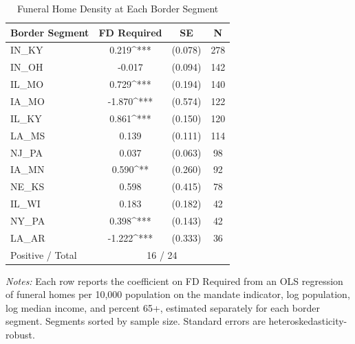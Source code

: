 \begin{table}[t]
\centering
\caption{Funeral Home Density at Each Border Segment}
\label{tab:segments}
\small
\begin{tabular}{lccc}
\hline\hline
 Border Segment & FD Required & SE & N \\
\hline
\addlinespace
  IN_KY & 0.219^{***} & (0.078) & 278 \\
  IN_OH & -0.017 & (0.094) & 142 \\
  IL_MO & 0.729^{***} & (0.194) & 140 \\
  IA_MO & -1.870^{***} & (0.574) & 122 \\
  IL_KY & 0.861^{***} & (0.150) & 120 \\
  LA_MS & 0.139 & (0.111) & 114 \\
  NJ_PA & 0.037 & (0.063) & 98 \\
  IA_MN & 0.590^{**} & (0.260) & 92 \\
  NE_KS & 0.598 & (0.415) & 78 \\
  IL_WI & 0.183 & (0.182) & 42 \\
  NY_PA & 0.398^{***} & (0.143) & 42 \\
  LA_AR & -1.222^{***} & (0.333) & 36 \\
\addlinespace
\hline
  Positive / Total & \multicolumn{3}{c}{16 / 24} \\
\hline\hline
\end{tabular}
\begin{tablenotes}
\item \textit{Notes:} Each row reports the coefficient on FD Required from an OLS regression of funeral homes per 10,000 population on the mandate indicator, log population, log median income, and percent 65+, estimated separately for each border segment. Segments sorted by sample size. Standard errors are heteroskedasticity-robust.
\end{tablenotes}
\end{table}

